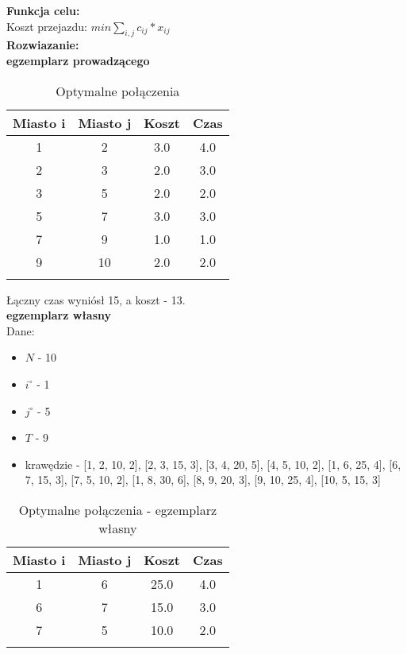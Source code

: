 \documentclass[15pt, a4paper]{article}
\begin{document}
\noindent\textbf{Funkcja celu:}\\

Koszt przejazdu: \(min \sum_{i, j}c_{ij} * x_{ij} \)\\

\noindent\textbf{Rozwiazanie:}\\ 

\textbf{egzemplarz prowadzącego} 

\begin{longtable}{|c|c|c|c|}
    \hline
    \textbf{Miasto i} & \textbf{Miasto j} & \textbf{Koszt} & \textbf{Czas} \\ 
    \hline
    1 & 2 & 3.0 & 4.0 \\ 
    \hline
    2 & 3 & 2.0 & 3.0 \\ 
    \hline
    3 & 5 & 2.0 & 2.0 \\ 
    \hline
    5 & 7 & 3.0 & 3.0 \\ 
    \hline
    7 & 9 & 1.0 & 1.0 \\ 
    \hline
    9 & 10 & 2.0 & 2.0 \\
    \hline
\caption{Optymalne połączenia}
\end{longtable}

Łączny czas wyniósł 15, a koszt - 13.\\

\textbf{egzemplarz własny}\\

Dane: 

\begin{itemize}
    \item \(N\) - 10
    \item \(i^{\circ}\) - 1
    \item \(j^{\circ}\) - 5
    \item \(T \) - 9
    \item krawędzie -  [1, 2, 10, 2],
    [2, 3, 15, 3],
    [3, 4, 20, 5],
    [4, 5, 10, 2],
    [1, 6, 25, 4],
    [6, 7, 15, 3],
    [7, 5, 10, 2],
    [1, 8, 30, 6],
    [8, 9, 20, 3],
    [9, 10, 25, 4],
    [10, 5, 15, 3]
\end{itemize}

\begin{longtable}{|c|c|c|c|}
    \hline
    \textbf{Miasto i} & \textbf{Miasto j} & \textbf{Koszt} & \textbf{Czas} \\ 
    \hline
    1 & 6 & 25.0 & 4.0 \\ 
    \hline
    6 & 7 & 15.0 & 3.0 \\ 
    \hline
    7 & 5 & 10.0 & 2.0 \\ 
    \hline
\caption{Optymalne połączenia - egzemplarz własny}
\end{longtable}
\end{document}
